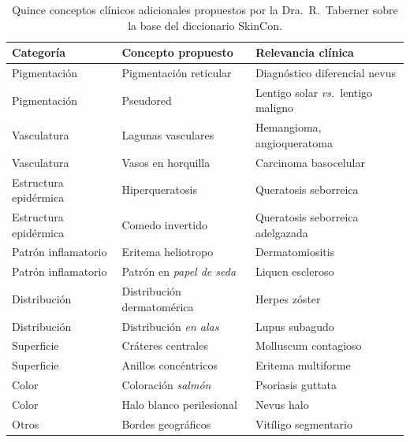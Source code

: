 \begin{table}[H]
\centering
\footnotesize
\setlength{\tabcolsep}{4pt}
\renewcommand{\arraystretch}{0.95}
\caption{Quince conceptos clínicos adicionales propuestos por la
Dra.~R.~Taberner sobre la base del diccionario SkinCon.}
\label{tab:anexof-propuesta}
\begin{tabular}{lll}
\hline
Categoría                       & Concepto propuesto                & Relevancia clínica \\
\hline
Pigmentación                    & Pigmentación reticular            & Diagnóstico diferencial nevus \\
Pigmentación                    & Pseudored                         & Lentigo solar \emph{vs.}\ lentigo maligno \\
Vasculatura                     & Lagunas vasculares                & Hemangioma, angioqueratoma \\
Vasculatura                     & Vasos en horquilla                 & Carcinoma basocelular \\
Estructura epidérmica           & Hiperqueratosis                    & Queratosis seborreica \\
Estructura epidérmica           & Comedo invertido                   & Queratosis seborreica adelgazada \\
Patrón inflamatorio             & Eritema heliotropo                 & Dermatomiositis \\
Patrón inflamatorio             & Patrón en \emph{papel de seda}     & Liquen escleroso \\
Distribución                    & Distribución dermatomérica         & Herpes zóster \\
Distribución                    & Distribución \emph{en alas}        & Lupus subagudo \\
Superficie                      & Cráteres centrales                 & Molluscum contagioso \\
Superficie                      & Anillos concéntricos               & Eritema multiforme \\
Color                           & Coloración \emph{salmón}           & Psoriasis guttata \\
Color                           & Halo blanco perilesional           & Nevus halo \\
Otros                           & Bordes geográficos                 & Vitíligo segmentario \\
\hline
\end{tabular}
\end{table}

